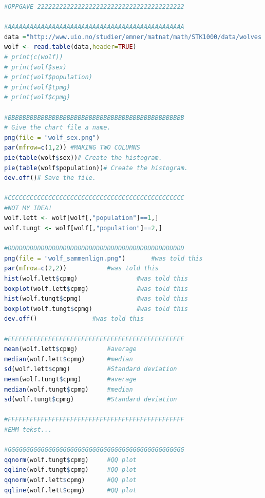 \pagebreak
\begin{lstlisting}[language=R]
#OPPGAVE 2222222222222222222222222222222222222222

#AAAAAAAAAAAAAAAAAAAAAAAAAAAAAAAAAAAAAAAAAAAAAAAA
data ="http://www.uio.no/studier/emner/matnat/math/STK1000/data/wolves.txt"
wolf <- read.table(data,header=TRUE)
# print(c(wolf))
# print(wolf$sex)
# print(wolf$population)
# print(wolf$tpmg)
# print(wolf$cpmg)

#BBBBBBBBBBBBBBBBBBBBBBBBBBBBBBBBBBBBBBBBBBBBBBBB
# Give the chart file a name.
png(file = "wolf_sex.png")
par(mfrow=c(1,2)) #MAKING TWO COLUMNS
pie(table(wolf$sex))# Create the histogram.
pie(table(wolf$population))# Create the histogram.
dev.off()# Save the file.

#CCCCCCCCCCCCCCCCCCCCCCCCCCCCCCCCCCCCCCCCCCCCCCCC
#NOT MY IDEA!
wolf.lett <- wolf[wolf[,"population"]==1,]
wolf.tungt <- wolf[wolf[,"population"]==2,]

#DDDDDDDDDDDDDDDDDDDDDDDDDDDDDDDDDDDDDDDDDDDDDDDD
png(file = "wolf_sammenlign.png")		#was told this
par(mfrow=c(2,2))			#was told this
hist(wolf.lett$cpmg)				#was told this
boxplot(wolf.lett$cpmg)				#was told this
hist(wolf.tungt$cpmg)				#was told this
boxplot(wolf.tungt$cpmg)			#was told this
dev.off()				#was told this

#EEEEEEEEEEEEEEEEEEEEEEEEEEEEEEEEEEEEEEEEEEEEEEEE
mean(wolf.lett$cpmg)		#average
median(wolf.lett$cpmg)		#median
sd(wolf.lett$cpmg)			#Standard deviation
mean(wolf.tungt$cpmg)		#average
median(wolf.tungt$cpmg)		#median
sd(wolf.tungt$cpmg)			#Standard deviation

#FFFFFFFFFFFFFFFFFFFFFFFFFFFFFFFFFFFFFFFFFFFFFFFF
#EHM tekst... 

#GGGGGGGGGGGGGGGGGGGGGGGGGGGGGGGGGGGGGGGGGGGGGGGG
qqnorm(wolf.tungt$cpmg)		#QQ plot
qqline(wolf.tungt$cpmg)		#QQ plot
qqnorm(wolf.lett$cpmg)		#QQ plot
qqline(wolf.lett$cpmg)		#QQ plot
\end{lstlisting}





















